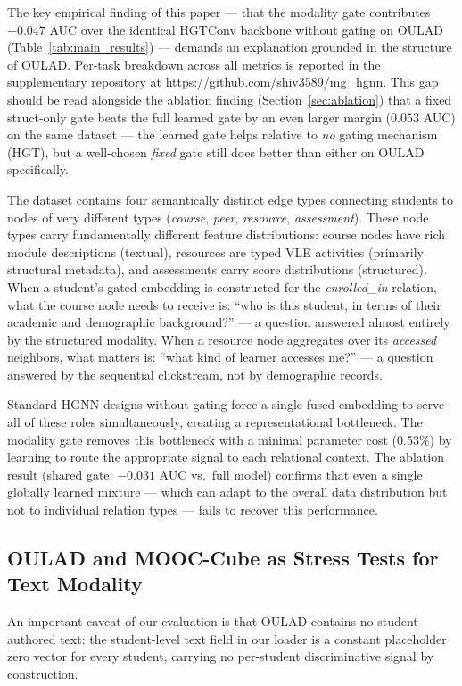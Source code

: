 \documentclass[sigconf,review]{acmart}
\begin{document}
The key empirical finding of this paper --- that the
modality gate contributes $+0.047$ AUC over the
identical HGTConv backbone without gating on OULAD
(Table~\ref{tab:main_results}) --- demands an
explanation grounded in the structure of OULAD.
Per-task breakdown across all metrics is reported in
the supplementary repository at
\url{https://github.com/shiv3589/mg_hgnn}. This gap
should be read alongside
the ablation finding (Section~\ref{sec:ablation}) that
a fixed struct-only gate beats the full learned gate by
an even larger margin ($0.053$ AUC) on the same dataset
--- the learned gate helps relative to \emph{no}
gating mechanism (HGT), but a well-chosen \emph{fixed}
gate still does better than either on OULAD specifically.

The dataset contains four semantically distinct edge
types connecting students to nodes of very different
types (\textit{course}, \textit{peer},
\textit{resource}, \textit{assessment}).
These node types carry fundamentally different
feature distributions:
course nodes have rich module descriptions
(textual), resources are typed VLE activities
(primarily structural metadata), and assessments
carry score distributions (structured). When a
student's gated embedding is constructed for the
\textit{enrolled\_in} relation, what the course node
needs to receive is: ``who is this student, in terms
of their academic and demographic background?'' ---
a question answered almost entirely by the structured
modality. When a resource node aggregates over its
\textit{accessed} neighbors, what matters is:
``what kind of learner accesses me?'' --- a question
answered by the sequential clickstream, not by
demographic records.

Standard HGNN designs without gating force a single
fused embedding to serve all of these roles
simultaneously, creating a representational
bottleneck. The modality gate removes this
bottleneck with a minimal parameter cost (0.53\%)
by learning to route the appropriate signal to
each relational context. The ablation result
(shared gate: $-0.031$ AUC vs.\ full model)
confirms that even a single globally learned mixture
--- which can adapt to the overall data distribution
but not to individual relation types --- fails to
recover this performance.

\subsection{OULAD and MOOC-Cube as Stress Tests for
Text Modality}

An important caveat of our evaluation is that OULAD
contains no student-authored text: the student-level
text field in our loader is a constant placeholder
zero vector for every student, carrying no
per-student discriminative signal by construction.
\end{document}
